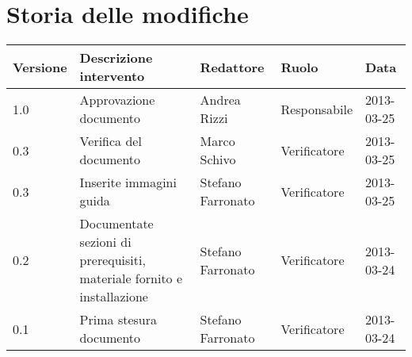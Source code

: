 \newcommand{\docName}{Manuale di installazione}
\newcommand{\docFileName}{manuale\_di\_installazione}
\newcommand{\docVers}{1.0}
\newcommand{\creationDate}{2013-03-24}
\newcommand{\modificationDate}{2013-03-25}
\newcommand{\docState}{Approvato}
\newcommand{\docUsage}{Esterno}
\newcommand{\docDistributionList}{Installatore del sistema}
\newcommand{\docAuthors}{Stefano Farronato}
\newcommand{\approvedBy}{Andrea Rizzi}
\newcommand{\verifiedBy}{Marco Schivo}
\newcommand{\docRoot}{..}
\def\INDICETABELLE{false}
\def\INDICEFIGURE{false}







\section*{Storia delle modifiche}

\begin{tabularx}{\textwidth}{lXlll}
\toprule
Versione & Descrizione intervento & Redattore & Ruolo & Data\\
\midrule %
1.0 & Approvazione documento& Andrea Rizzi & Responsabile & 2013-03-25\\
0.3 & Verifica del documento & Marco Schivo & Verificatore & 2013-03-25\\
0.3 & Inserite immagini guida& Stefano Farronato & Verificatore & 2013-03-25\\
0.2 & Documentate sezioni  di prerequisiti, materiale fornito e installazione& Stefano Farronato & Verificatore & 2013-03-24\\
0.1 & Prima stesura documento & Stefano Farronato & Verificatore & 2013-03-24\\
\bottomrule
\end{tabularx}
\newpage

